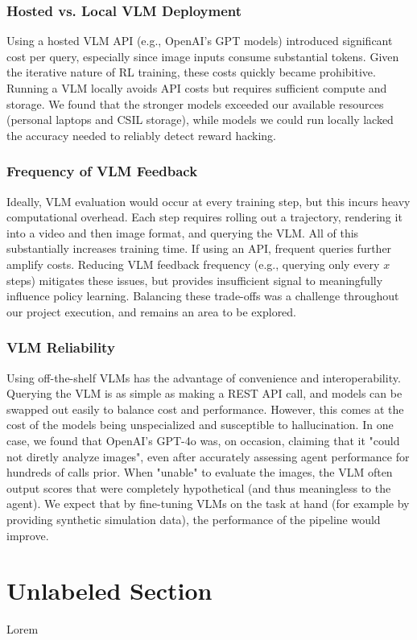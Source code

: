 \documentclass{article}
\begin{document}
\subsubsection{Hosted vs. Local VLM Deployment}
Using a hosted VLM API (e.g., OpenAI's GPT models) introduced significant cost per query, especially since image inputs consume substantial tokens. Given the iterative nature of RL training, these costs quickly became prohibitive. Running a VLM locally avoids API costs but requires sufficient compute and storage. We found that the stronger models exceeded our available resources (personal laptops and CSIL storage), while models we could run locally lacked the accuracy needed to reliably detect reward hacking.

\subsubsection{Frequency of VLM Feedback}
Ideally, VLM evaluation would occur at every training step, but this incurs heavy computational overhead. Each step requires rolling out a trajectory, rendering it into a video and then image format, and querying the VLM. All of this substantially increases training time. If using an API, frequent queries further amplify costs. Reducing VLM feedback frequency (e.g., querying only every $x$ steps) mitigates these issues, but provides insufficient signal to meaningfully influence policy learning. Balancing these trade-offs was a challenge throughout our project execution, and remains an area to be explored.

\subsubsection{VLM Reliability}
Using off-the-shelf VLMs has the advantage of convenience and interoperability. Querying the VLM is as simple as making a REST API call, and models can be swapped out easily to balance cost and performance. However, this comes at the cost of the models being unspecialized and susceptible to hallucination. In one case, we found that OpenAI's GPT-4o was, on occasion, claiming that it "could not diretly analyze images", even after accurately assessing agent performance for hundreds of calls prior. When "unable" to evaluate the images, the VLM often output scores that were completely hypothetical (and thus meaningless to the agent). We expect that by fine-tuning VLMs on the task at hand (for example by providing synthetic simulation data), the performance of the pipeline would improve. 


\section*{Unlabeled Section}
Lorem


 
\end{document}
